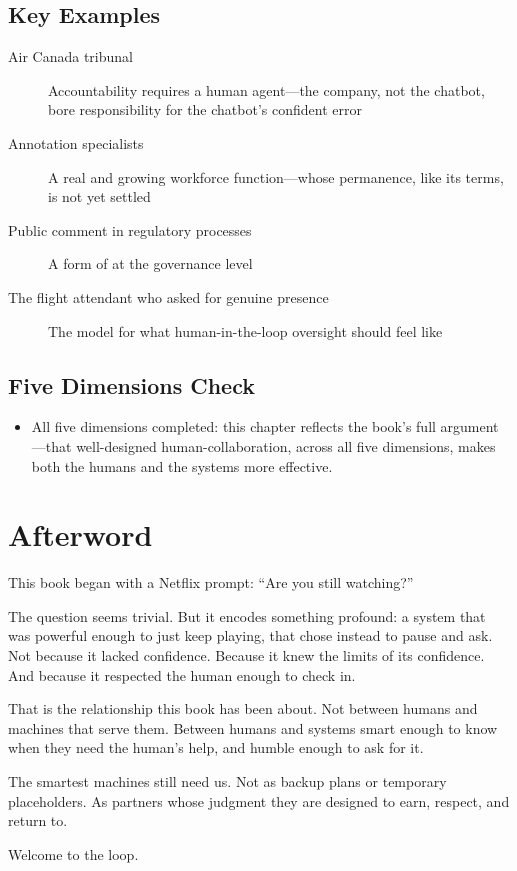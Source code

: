 \subsection*{Key Examples}

\begin{description}
  \item[Air Canada tribunal] Accountability requires a human agent---the company, not the chatbot, bore responsibility for the chatbot's confident error
  \item[Annotation specialists] A real and growing workforce function---whose permanence, like its terms, is not yet settled
  \item[Public comment in \ai regulatory processes] A form of \hitl at the governance level
  \item[The flight attendant who asked for genuine presence] The model for what human-in-the-loop oversight should feel like
\end{description}

\subsection*{Five Dimensions Check}

\begin{itemize}
  \item All five dimensions completed: this chapter reflects the book's full argument---that well-designed human-\ai collaboration, across all five dimensions, makes both the humans and the \ai systems more effective.
\end{itemize}

\section*{Afterword}

This book began with a Netflix prompt: ``Are you still watching?''

The question seems trivial. But it encodes something profound: a system that was powerful enough to just keep playing, that chose instead to pause and ask. Not because it lacked confidence. Because it knew the limits of its confidence. And because it respected the human enough to check in.

That is the relationship this book has been about. Not between humans and machines that serve them. Between humans and systems smart enough to know when they need the human's help, and humble enough to ask for it.

The smartest machines still need us. Not as backup plans or temporary placeholders. As partners whose judgment they are designed to earn, respect, and return to.

Welcome to the loop.
